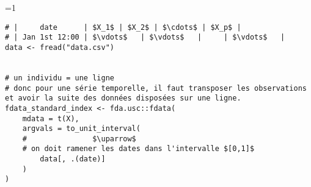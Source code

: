 \ifnum\value{code}=1
	\begin{verbatim} 
# |     date      | $X_1$ | $X_2$ | $\cdots$ | $X_p$ |
# | Jan 1st 12:00 | $\vdots$   | $\vdots$   |     | $\vdots$   |
data <- fread("data.csv")


# un individu = une ligne
# donc pour une série temporelle, il faut transposer les observations et avoir la suite des données disposées sur une ligne.
fdata_standard_index <- fda.usc::fdata(
    mdata = t(X),
    argvals = to_unit_interval(
    #               $\uparrow$
    # on doit ramener les dates dans l'intervalle $[0,1]$
        data[, .(date)]
    )
)
\end{verbatim}
\fi
